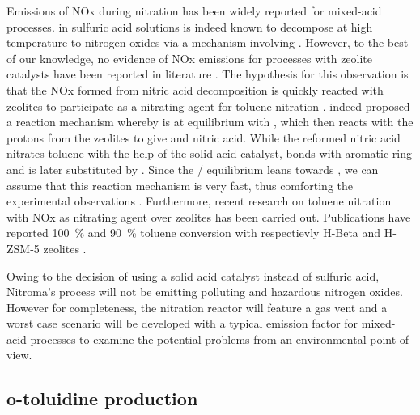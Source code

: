Emissions of NOx during nitration has been widely reported for mixed-acid processes\cite{halder_nitration_2007,processes_research_inc_air_1972}.  in sulfuric acid solutions is indeed known to decompose at high temperature to nitrogen oxides via a mechanism involving  \cite{robertson_kinetics_1955, kazakov_kinetics_1987}. However, to the best of our knowledge, no evidence of NOx emissions for processes with zeolite catalysts have been reported in literature \cite{vassena_selective_1999,sreedhar_scientific_2013}. The hypothesis for this observation is that the NOx formed from nitric acid decomposition is quickly reacted with zeolites to participate as a nitrating agent for toluene nitration \cite{akolekar_high_1995}. \textcite{akolekar_high_1995} indeed proposed a reaction mechanism whereby  is at equilibrium with , which then reacts with the protons from the zeolites to give  and nitric acid. While the reformed nitric acid nitrates toluene with the help of the solid acid catalyst,  bonds with aromatic ring and is later substituted by . Since the / equilibrium leans towards , we can assume that this reaction mechanism is very fast, thus comforting the experimental observations \cite{university_of_texas_chapter_nodate}. Furthermore, recent research on toluene nitration with NOx as nitrating agent over zeolites has been carried out. Publications have reported \SI{100}{\percent} and \SI{90}{\percent} toluene conversion with respectievly H-Beta and H-ZSM-5 zeolites \cite{pande_nitration_2010, peng_zeolite-assisted_2001}.

Owing to the decision of using a solid acid catalyst instead of sulfuric acid, Nitroma's process will not be emitting polluting and hazardous nitrogen oxides. However for completeness, the nitration reactor will feature a gas vent and a worst case scenario will be developed with a typical emission factor for mixed-acid processes to examine the potential problems from an environmental point of view.

\subsection{o-toluidine production}

